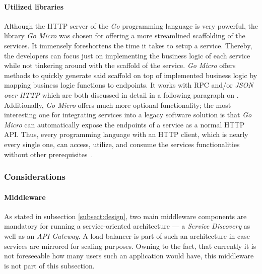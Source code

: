 \documentclass[12pt,a4paper,twoside]{report}
\begin{document}
\paragraph{Utilized libraries}
Although the HTTP server of the \textit{Go} programming language is very powerful,
the library \textit{Go Micro} was chosen for offering a more streamlined
scaffolding of the services. It immensely foreshortens the time it takes to setup a service.
Thereby, the developers can focus just on implementing the business logic
of each service while not tinkering around with the scaffold of the service.
\textit{Go Micro} offers methods to quickly generate said scaffold on top
of implemented business logic by mapping business logic functions to endpoints.
It works with RPC and/or \textit{JSON over HTTP} which are both discussed
in detail in a following paragraph on \textit{}.
Additionally, \textit{Go Micro} offers much more optional functionality;
the most interesting one for integrating services into a legacy software solution
is that \textit{Go Micro} can automatically expose the endpoints of a service
as a normal HTTP API. Thus, every programming language with an HTTP client,
which is nearly every single one, can access, utilize, and consume the services
functionalities without other prerequisites~\cite{go-micro}.


\subsubsection{Considerations}

\paragraph{Middleware}
As stated in subsection \ref{subsect:design}, two main middleware components
are mandatory for running a service-oriented architecture ---
a \textit{Service Discovery} as well as an \textit{API Gateway}.
A load balancer is part of such an architecture in case services are mirrored
for scaling purposes. Owning to the fact, that currently it is not foreseeable
how many users such an application would have, this middleware is not part of
this subsection.
\end{document}
